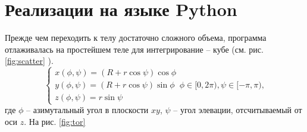 

\section{Реализации на языке Python}

Прежде чем переходить к телу достаточно сложного объема, программа отлаживалась
на простейшем теле для интегрирование -- кубе (см. рис. \ref{fig:scatter} ).
\begin{equation}
    \label{eq:tor}
    \begin{cases}
        x(\phi, \psi) = (R + r\cos \psi) \cos \phi \\
        y(\phi, \psi) = (R + r\cos \psi) \sin \phi \\
        z(\phi, \psi) = r\sin \psi
    \end{cases}
    \phi \in [0, 2\pi), \psi \in [-\pi, \pi),
\end{equation}
где $\phi$ -- азимутальный угол в плоскости  $xy$,  $\psi$ -- угол элевации,
отсчитываемый от оси $z$. На рис. \ref{fig:tor}
